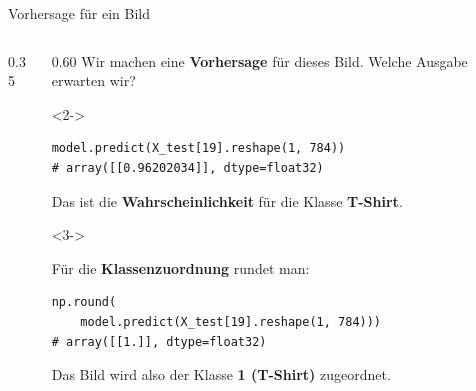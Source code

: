 \begin{frame}[fragile]{Vorhersage für ein Bild}

\begin{columns}

\begin{column}{0.35\textwidth}
\centering

\end{column}

\begin{column}{0.60\textwidth}
\footnotesize
Wir machen eine \textbf{Vorhersage} für dieses Bild.
Welche Ausgabe erwarten wir?

\begin{uncoverenv}<2->

\vspace{0.5em}

\begin{verbatim}
model.predict(X_test[19].reshape(1, 784))
# array([[0.96202034]], dtype=float32)
\end{verbatim}

Das ist die \textbf{Wahrscheinlichkeit} für die Klasse
\textbf{T-Shirt}.

\end{uncoverenv}

\begin{uncoverenv}<3->

\vspace{0.5em}

Für die \textbf{Klassenzuordnung} rundet man:

\begin{verbatim}
np.round(
    model.predict(X_test[19].reshape(1, 784)))
# array([[1.]], dtype=float32)
\end{verbatim}

Das Bild wird also der Klasse \textbf{1 (T-Shirt)}
zugeordnet.
\end{uncoverenv}
\end{column}
\end{columns}
\end{frame}

